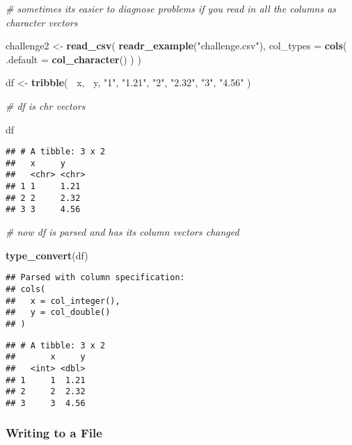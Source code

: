 \documentclass[]{article}
\newenvironment{Shaded}{\begin{snugshade}}{\end{snugshade}}
\newcommand{\KeywordTok}[1]{\textcolor[rgb]{0.13,0.29,0.53}{\textbf{#1}}}
\newcommand{\DataTypeTok}[1]{\textcolor[rgb]{0.13,0.29,0.53}{#1}}
\newcommand{\StringTok}[1]{\textcolor[rgb]{0.31,0.60,0.02}{#1}}
\newcommand{\CommentTok}[1]{\textcolor[rgb]{0.56,0.35,0.01}{\textit{#1}}}
\newcommand{\OperatorTok}[1]{\textcolor[rgb]{0.81,0.36,0.00}{\textbf{#1}}}
\newcommand{\NormalTok}[1]{#1}
\begin{document}
\begin{Shaded}
\begin{Highlighting}[]
\CommentTok{# sometimes its easier to diagnose problems if you read in all the columns as character vectors}

\NormalTok{challenge2 <-}\StringTok{ }\KeywordTok{read_csv}\NormalTok{(}
  \KeywordTok{readr_example}\NormalTok{(}\StringTok{"challenge.csv"}\NormalTok{), }
  \DataTypeTok{col_types =} \KeywordTok{cols}\NormalTok{(}
    \DataTypeTok{.default =} \KeywordTok{col_character}\NormalTok{()}
\NormalTok{  )}
\NormalTok{)}

\NormalTok{df <-}\StringTok{ }\KeywordTok{tribble}\NormalTok{(}
  \OperatorTok{~}\NormalTok{x, }\OperatorTok{~}\NormalTok{y, }
  \StringTok{"1"}\NormalTok{, }\StringTok{"1.21"}\NormalTok{,}
  \StringTok{"2"}\NormalTok{, }\StringTok{"2.32"}\NormalTok{, }
  \StringTok{"3"}\NormalTok{, }\StringTok{"4.56"}
\NormalTok{)}

\CommentTok{# df is chr vectors}

\NormalTok{df}
\end{Highlighting}
\end{Shaded}

\begin{verbatim}
## # A tibble: 3 x 2
##   x     y    
##   <chr> <chr>
## 1 1     1.21 
## 2 2     2.32 
## 3 3     4.56
\end{verbatim}

\begin{Shaded}
\begin{Highlighting}[]
\CommentTok{# now df is parsed and has its column vectors changed}

\KeywordTok{type_convert}\NormalTok{(df)}
\end{Highlighting}
\end{Shaded}

\begin{verbatim}
## Parsed with column specification:
## cols(
##   x = col_integer(),
##   y = col_double()
## )
\end{verbatim}

\begin{verbatim}
## # A tibble: 3 x 2
##       x     y
##   <int> <dbl>
## 1     1  1.21
## 2     2  2.32
## 3     3  4.56
\end{verbatim}

\subsubsection{Writing to a File}\label{writing-to-a-file}
\end{document}
